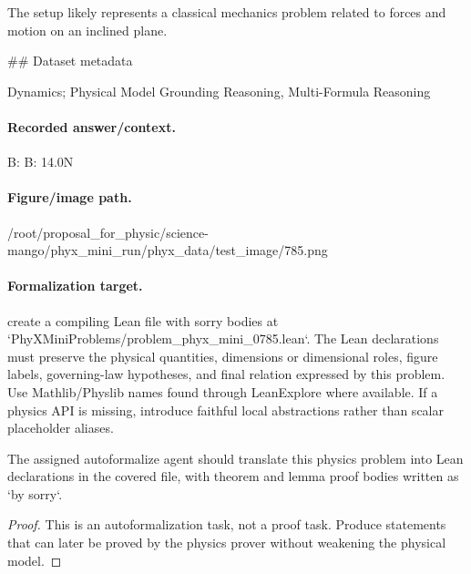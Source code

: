 The setup likely represents a classical mechanics problem related to forces and motion on an inclined plane.

\#\# Dataset metadata

Dynamics; Physical Model Grounding Reasoning, Multi-Formula Reasoning

\paragraph{Recorded answer/context.}
B: B: 14.0N

\paragraph{Figure/image path.}
/root/proposal\_for\_physic/science-mango/phyx\_mini\_run/phyx\_data/test\_image/785.png

\paragraph{Formalization target.}
create a compiling Lean file with sorry bodies at `PhyXMiniProblems/problem\_phyx\_mini\_0785.lean`. The Lean declarations must preserve the physical quantities, dimensions or dimensional roles, figure labels, governing-law hypotheses, and final relation expressed by this problem.
Use Mathlib/Physlib names found through LeanExplore where available. If a physics API is missing, introduce faithful local abstractions rather than scalar placeholder aliases.

\begin{theorem}
\label{thm:physics:phyx_mini_0785:target}
The assigned autoformalize agent should translate this physics problem into Lean declarations in the covered file, with theorem and lemma proof bodies written as `by sorry`.
\end{theorem}
\begin{proof}
This is an autoformalization task, not a proof task. Produce statements that can later be proved by the physics prover without weakening the physical model.
\end{proof}

